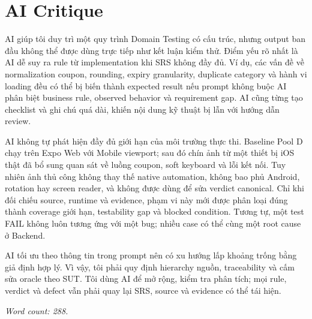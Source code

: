\chapter{AI Critique}

AI giúp tôi duy trì một quy trình Domain Testing có cấu trúc, nhưng output ban
đầu không thể được dùng trực tiếp như kết luận kiểm thử. Điểm yếu rõ nhất là AI
dễ suy ra rule từ implementation khi SRS không đầy đủ. Ví dụ, các vấn đề về
normalization coupon, rounding, expiry granularity, duplicate category và hành
vi loading đều có thể bị biến thành expected result nếu prompt không buộc AI
phân biệt business rule, observed behavior và requirement gap. AI cũng từng tạo
checklist và ghi chú quá dài, khiến nội dung kỹ thuật bị lẫn với hướng dẫn review.

AI không tự phát hiện đầy đủ giới hạn của môi trường thực thi. Baseline Pool D
chạy trên Expo Web với Mobile viewport; sau đó chín ảnh từ một thiết bị iOS thật
đã bổ sung quan sát về luồng coupon, soft keyboard và lỗi kết nối. Tuy nhiên ảnh
thủ công không thay thế native automation, không bao phủ Android, rotation hay
screen reader, và không được dùng để sửa verdict canonical. Chỉ khi đối chiếu
source, runtime và evidence, phạm vi này mới được phân loại đúng thành coverage
giới hạn, testability gap và blocked condition. Tương tự, một test FAIL không
luôn tương ứng với một bug; nhiều case có thể cùng một root cause ở Backend.

AI tối ưu theo thông tin trong prompt nên có xu hướng lấp khoảng trống bằng giả
định hợp lý. Vì vậy, tôi phải quy định hierarchy nguồn, traceability và cấm sửa
oracle theo SUT. Tôi dùng AI để mở rộng, kiểm tra phân tích; mọi rule, verdict và
defect vẫn phải quay lại SRS, source và evidence có thể tái hiện.

\textit{Word count: 288.}
